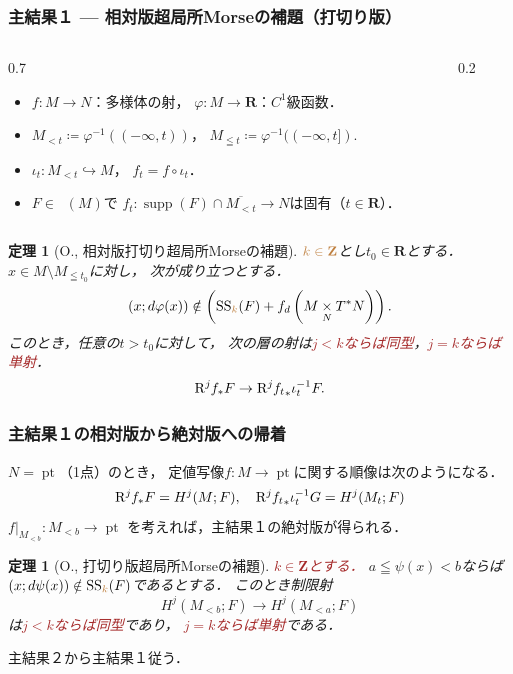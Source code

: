 \documentclass[dvipdfmx,10pt,aspectratio=169,leqno]{beamer}%
\newcommand{\zz}{\mathbf{Z}}
\newcommand{\rr}{\mathbf{R}}
\numberwithin{equation}{subsection}
\newcommand{\pt}{\mathop{\mathrm{pt}}\nolimits}
\newcommand{\supp}{\mathop{\mathrm{supp}}\nolimits}
\newcommand{\Dompb}{\mathop{\mathsf{D}^\mathrm{b}}\nolimits}
\newcommand{\muS}[1][]{\mathop{\mathrm{SS}}\nolimits_{#1}}
\newcommand{\Rder}[1][]{\mathop{\mathrm{R}^{#1}\hspace{-2pt}}\nolimits}
\newcommand{\mres}[2][]{{\left.{#1}\right\rvert}_{#2}}
\newcommand{\mdiff}[1][]{{#1}_{d}} %
\newcommand{\pb}[1][]{\mathbin{\mathop{\times}\limits_{#1}}}
\newcommand{\cotb}[1][]{T^{\ast}{#1}}
\theoremstyle{mystyle}
\newtheorem{THM}[AXM]{定理}
\begin{document}
\begin{frame}[fragile]
  \frametitle{主結果１ --- 相対版超局所Morseの補題（打切り版）}
  \begin{columns}
    \begin{column}{0.7\hsize}
      \begin{itemize}
        \item \(f\colon M\to N\)：多様体の射，
        \quad\(\varphi\colon M\to \rr\)：\(C^{1}\)級函数．
        \item \(M_{<t}\coloneqq \varphi^{-1}((-\infty,t))\)，\quad
        \(M_{\leqq t}\coloneqq \varphi^{-1}((-\infty,t])\).
        \item \(\iota_{t}\colon M_{<t}\hookrightarrow M\)，
        \quad\(f_{t}=f\circ \iota_{t}\)．
        \item \(F\in\Dompb(M)\)で
        \(f_{t}\colon \supp(F)\cap \overline{M_{<t}}\to N\)は固有（\(t\in\rr\)）．
      \end{itemize}
    \end{column}
    \begin{column}{0.2\hsize}
    \end{column}
  \end{columns}
  \begin{THM}[O., 相対版打切り超局所Morseの補題]
    \(\textcolor{brown}{k\in\zz}\)とし\(t_{0}\in\rr\)とする．
    \(x\in M\setminus M_{\leqq t_{0}}\)に対し，
    次が成り立つとする．\[
        (x;d\varphi(x))\notin \left(
          \muS[\textcolor{brown}{k}](F)+ \mdiff[f]\left(
            M\pb[N]\cotb[N]
          \right)
        \right).
      \]
    このとき，任意の\(t>t_{0}\)に対して，
    次の層の射は\textcolor{brown}{\(j<k\)ならば同型}，\textcolor{brown}{\(j=k\)ならば単射}．
    \[
      \Rder[j]{f_{\ast}}F
      \to
      \Rder[j]{{f_{t}}_{\ast}}\iota^{-1}_{t}F.
    \]
  \end{THM}
\end{frame}
\begin{frame}
  \frametitle{主結果１の相対版から絶対版への帰着}
  \(N=\pt\)（1点）のとき，
  定値写像\(f\colon M\to \pt\)に関する順像は次のようになる．\[
    \Rder[j]{f_{\ast}}F=H^{j}(M;F),
    \quad
    \Rder[j]{{f_{t}}_{\ast}}\iota^{-1}_{t}G
    =H^{j}(M_{t};F)
  \]
  \(\mres[f]{M_{<b}}\colon M_{<b}\to \pt\)
  を考えれば，主結果１の絶対版が得られる．
  \begin{THM}[O., 打切り版超局所Morseの補題]
    \textcolor{brown}{\(k\in\zz\)とする．}
    \(a\leqq\psi(x)< b\)ならば
    \((x;d\psi(x))\notin\muS[\textcolor{brown}{k}](F)\)であるとする．
    このとき制限射\[
        H^{j}(M_{<b};F)\longrightarrow H^{j}(M_{<a};F)
    \]は\textcolor{brown}{\(j<k\)ならば同型}であり，
    \textcolor{brown}{\(j=k\)ならば単射}である．
  \end{THM}    
  主結果２から主結果１従う．
\end{frame}
\end{document}
